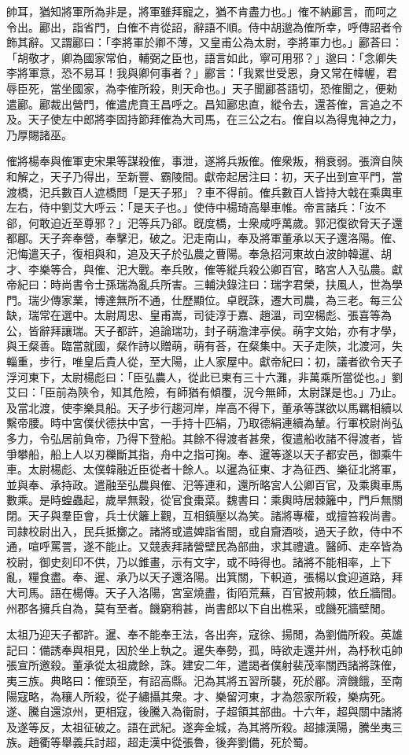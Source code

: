 \begin{pinyinscope}
帥耳，猶知將軍所為非是，將軍雖拜寵之，猶不肯盡力也。」傕不納酈言，而呵之令出。酈出，詣省門，白傕不肯從詔，辭語不順。侍中胡邈為傕所幸，呼傳詔者令飾其辭。又謂酈曰：「李將軍於卿不薄，又皇甫公為太尉，李將軍力也。」酈荅曰：「胡敬才，卿為國家常伯，輔弼之臣也，語言如此，寧可用邪？」邈曰：「念卿失李將軍意，恐不易耳！我與卿何事者？」酈言：「我累世受恩，身又常在幃幄，君辱臣死，當坐國家，為李傕所殺，則天命也。」天子聞酈荅語切，恐傕聞之，便勑遣酈。酈裁出營門，傕遣虎賁王昌呼之。昌知酈忠直，縱令去，還荅傕，言追之不及。天子使左中郎將李固持節拜傕為大司馬，在三公之右。傕自以為得鬼神之力，乃厚賜諸巫。

傕將楊奉與傕軍吏宋果等謀殺傕，事泄，遂將兵叛傕。傕衆叛，稍衰弱。張濟自陝和解之，天子乃得出，至新豐、霸陵間。獻帝起居注曰：初，天子出到宣平門，當渡橋，汜兵數百人遮橋問「是天子邪」？車不得前。傕兵數百人皆持大戟在乘輿車左右，侍中劉艾大呼云：「是天子也。」使侍中楊琦高舉車帷。帝言諸兵：「汝不郤，何敢迫近至尊邪？」汜等兵乃郤。旣度橋，士衆咸呼萬歲。郭汜復欲脅天子還都郿。天子奔奉營，奉擊汜，破之。汜走南山，奉及將軍董承以天子還洛陽。傕、汜悔遣天子，復相與和，追及天子於弘農之曹陽。奉急招河東故白波帥韓暹、胡才、李樂等合，與傕、汜大戰。奉兵敗，傕等縱兵殺公卿百官，略宮人入弘農。獻帝紀曰：時尚書令士孫瑞為亂兵所害。三輔決錄注曰：瑞字君榮，扶風人，世為學門。瑞少傳家業，博達無所不通，仕歷顯位。卓旣誅，遷大司農，為三老。每三公缺，瑞常在選中。太尉周忠、皇甫嵩，司徒淳于嘉、趙溫，司空楊彪、張喜等為公，皆辭拜讓瑞。天子都許，追論瑞功，封子萌澹津亭侯。萌字文始，亦有才學，與王粲善。臨當就國，粲作詩以贈萌，萌有荅，在粲集中。天子走陝，北渡河，失輜重，步行，唯皇后貴人從，至大陽，止人家屋中。獻帝紀曰：初，議者欲令天子浮河東下，太尉楊彪曰：「臣弘農人，從此已東有三十六灘，非萬乘所當從也。」劉艾曰：「臣前為陝令，知其危險，有師猶有傾覆，況今無師，太尉謀是也。」乃止。及當北渡，使李樂具船。天子步行趨河岸，岸高不得下，董承等謀欲以馬羈相續以繫帝腰。時中宮僕伏德扶中宮，一手持十匹絹，乃取德絹連續為輦。行軍校尉尚弘多力，令弘居前負帝，乃得下登船。其餘不得渡者甚衆，復遣船收諸不得渡者，皆爭攀船，船上人以刃櫟斷其指，舟中之指可掬。奉、暹等遂以天子都安邑，御乘牛車。太尉楊彪、太僕韓融近臣從者十餘人。以暹為征東、才為征西、樂征北將軍，並與奉、承持政。遣融至弘農與傕、汜等連和，還所略宮人公卿百官，及乘輿車馬數乘。是時蝗蟲起，歲旱無穀，從官食棗菜。魏書曰：乘輿時居棘籬中，門戶無關閉。天子與羣臣會，兵士伏籬上觀，互相鎮壓以為笑。諸將專權，或擅笞殺尚書。司隷校尉出入，民兵抵擲之。諸將或遣婢詣省閤，或自齎酒啖，過天子飲，侍中不通，喧呼罵詈，遂不能止。又競表拜諸營壁民為部曲，求其禮遺。醫師、走卒皆為校尉，御史刻印不供，乃以錐畫，示有文字，或不時得也。諸將不能相率，上下亂，糧食盡。奉、暹、承乃以天子還洛陽。出箕關，下軹道，張楊以食迎道路，拜大司馬。語在楊傳。天子入洛陽，宮室燒盡，街陌荒蕪，百官披荊棘，依丘牆間。州郡各擁兵自為，莫有至者。饑窮稍甚，尚書郎以下自出樵采，或饑死牆壁閒。

太祖乃迎天子都許。暹、奉不能奉王法，各出奔，寇徐、揚閒，為劉備所殺。英雄記曰：備誘奉與相見，因於坐上執之。暹失奉勢，孤，時欲走還并州，為杼秋屯帥張宣所邀殺。董承從太祖歲餘，誅。建安二年，遣謁者僕射裴茂率關西諸將誅傕，夷三族。典略曰：傕頭至，有詔高縣。汜為其將五習所襲，死於郿。濟饑餓，至南陽寇略，為穰人所殺，從子繡攝其衆。才、樂留河東，才為怨家所殺，樂病死。遂、騰自還涼州，更相寇，後騰入為衞尉，子超領其部曲。十六年，超與關中諸將及遂等反，太祖征破之。語在武紀。遂奔金城，為其將所殺。超據漢陽，騰坐夷三族。趙衢等舉義兵討超，超走漢中從張魯，後奔劉備，死於蜀。


\end{pinyinscope}